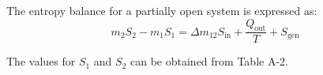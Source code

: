The entropy balance for a partially open system is expressed as:  
\[
m_2 S_2 - m_1 S_1 = \Delta m_{12} S_{\text{in}} + \frac{Q_{\text{out}}}{T} + S_{\text{gen}}
\]  

The values for \( S_1 \) and \( S_2 \) can be obtained from Table A-2.